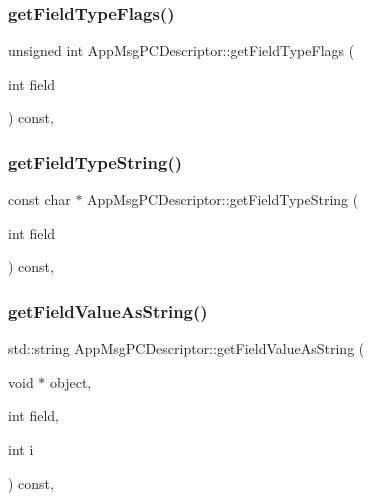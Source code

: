 \subsubsection{\texorpdfstring{get\+Field\+Type\+Flags()}{getFieldTypeFlags()}}
{\footnotesize\ttfamily unsigned int App\+Msg\+P\+C\+Descriptor\+::get\+Field\+Type\+Flags (\begin{DoxyParamCaption}\item[{int}]{field }\end{DoxyParamCaption}) const\hspace{0.3cm}{\ttfamily [override]}, {\ttfamily [virtual]}}

\mbox{\label{classAppMsgPCDescriptor_aa5a22389b1a0d2b8e97c936f69a2ed39}} 
\subsubsection{\texorpdfstring{get\+Field\+Type\+String()}{getFieldTypeString()}}
{\footnotesize\ttfamily const char $\ast$ App\+Msg\+P\+C\+Descriptor\+::get\+Field\+Type\+String (\begin{DoxyParamCaption}\item[{int}]{field }\end{DoxyParamCaption}) const\hspace{0.3cm}{\ttfamily [override]}, {\ttfamily [virtual]}}

\mbox{\label{classAppMsgPCDescriptor_ac5f4467bbe2dae35c300f7288bfc4003}} 
\subsubsection{\texorpdfstring{get\+Field\+Value\+As\+String()}{getFieldValueAsString()}}
{\footnotesize\ttfamily std\+::string App\+Msg\+P\+C\+Descriptor\+::get\+Field\+Value\+As\+String (\begin{DoxyParamCaption}\item[{void $\ast$}]{object,  }\item[{int}]{field,  }\item[{int}]{i }\end{DoxyParamCaption}) const\hspace{0.3cm}{\ttfamily [override]}, {\ttfamily [virtual]}}

